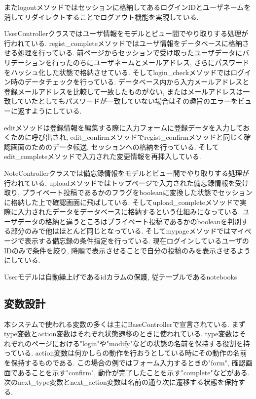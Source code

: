 \documentclass[submit,techrep]{ipsj}
\begin{document}
またlogoutメソッドではセッションに格納してあるログインIDとユーザネームを消してリダイレクトすることでログアウト機能を実現している. 

UserControllerクラスではユーザ情報をモデルとビュー間でやり取りする処理が行われている. regist\_completeメソッドではユーザ情報をデータベースに格納させる処理を行っている. 前ページからセッションで受け取ったユーザデータにバリデーションを行ったのちにユーザネームとメールアドレス, さらにパスワードをハッシュ化した状態で格納させている. 
そしてlogin\_checkメソッドではログイン時のデータチェックを行っている. データベース内から入力メールアドレスと登録メールアドレスを比較して一致したものがない, またはメールアドレスは一致していたとしてもパスワードが一致していない場合はその趣旨のエラーをビューに返すようにしている. 

editメソッドは登録情報を編集する際に入力フォームに登録データを入力しておくために呼び出され, edit\_confirmメソッドでregist\_confirmメソッドと同じく確認画面のためのデータ転送, セッションへの格納を行っている. そしてedit\_completeメソッドで入力された変更情報を再挿入している. 

NoteControllerクラスでは備忘録情報をモデルとビュー間でやり取りする処理が行われている. uploadメソッドではトップページで入力された備忘録情報を受け取り, プライベート投稿であるかのフラグをbooleanに変換した状態でセッションに格納した上で確認画面に飛ばしている. 
そしてupload\_completeメソッドで実際に入力されたデータをデータベースに格納するという仕組みになっている. ユーザデータの格納と違うところはプライベート投稿であるかのbooleanを判別する部分のみで他はほとんど同じとなっている. そしてmypageメソッドではマイページで表示する備忘録の条件指定を行っている. 現在ログインしているユーザのIDのみで条件を絞り, 降順で表示させることで自分の投稿のみを表示させるようにしている. 

Userモデルは自動繰上げであるidカラムの保護, 従テーブルであるnotebooks

\subsection{変数設計}
本システムで使われる変数の多くは主にBaseControllerで宣言されている. まずtype変数とaction変数はそれぞれ状態遷移のときに使われている. type変数はそれぞれのページにおける"login"や"modify"などの状態の名前を保持する役割を持っている. 
action変数は何かしらの動作を行おうとしている時にその動作の名前を保持するものである. この場合の例ではフォーム入力するときの"form", 確認画面であることを示す"confirm", 動作が完了したことを示す"complete"などがある. 
次のnext\_type変数とnext\_action変数は名前の通り次に遷移する状態を保持する. 
\end{document}

